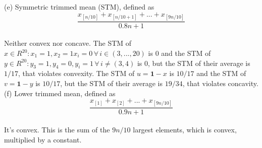 \documentclass{article}
\begin{document}
(e) Symmetric trimmed mean (STM), defined as \\
$$\frac{x_{[n / 10]} + x_{[n / 10 + 1]} + ... + x_{[9n / 10]}}
	{0.8 n + 1}$$\\
	
Neither convex nor concave. The STM of $x \in R^{20}: x_1 = 1, 
x_2 = 1 x_i = 0 \, \forall \, i \in (3,..., 20)$ is $0$ and the STM of $y \in R^{20}: y_3 = 1, y_4 = 0, y_i = 1 \, \forall \, i \neq 
(3, 4)$ is $0$, but the STM of their average is $1/17$, that violates convexity.  The STM of $u = \boldsymbol 1 - x$ is $10/17$ and the STM of $v = \boldsymbol 1 - y$ is $10/17$, but the STM of their average is $19/34$, that violates concavity. \\

(f) Lower trimmed mean, defined as 
$$\frac{x_{[1]} + x_{[2]} + ... + x_{[9n/10]}}{0.9 n + 1} $$ \\

It's convex. This is the sum of the $9n/10$ largest elements, which is convex, multiplied by a constant.
\end{document}
